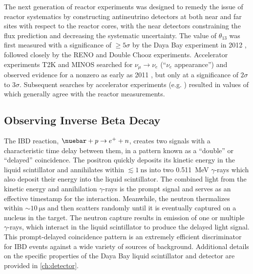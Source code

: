 The next generation of reactor experiments
was designed to remedy the issue of reactor systematics
by constructing antineutrino detectors at both near and far sites
with respect to the reactor cores,
with the near detectors constraining the flux prediction
and decreasing the systematic uncertainty.
The value of $\theta_{13}$ was first measured
with a significance of $\geq 5\sigma$
by the Daya Bay experiment in 2012 \cite{ngd2012},
followed closely by the RENO \cite{reno2012}
and Double Chooz \cite{doublechooz2012} experiments.
Accelerator experiments T2K and MINOS
searched for $\nu_\mu\to\nu_e$ (``$\nu_e$ appearance'')
and observed evidence for a nonzero \thetaot{}
as early as 2011 \cite{t2k2011,minos2011},
but only at a significance of $2\sigma$ to $3\sigma$.
Subsequent searches by accelerator experiments (e.g. \cite{t2k2018})
resulted in values of \thetaot{} which generally agree
with the reactor measurements.

\subsection{Observing Inverse Beta Decay}
\label{subsec:ibd_intro}

The IBD reaction, $\nuebar + p \to e^+ + n$,
creates two signals with a characteristic
time delay between them, in a pattern known as a ``double''
or ``delayed'' coincidence.
The positron quickly deposits its kinetic energy in the liquid scintillator
and annihilates within $\lesssim\SI{1}{\nano\second}$
into two \SI{0.511}{\MeV} $\gamma$-rays
which also deposit their energy into the liquid scintillator.
The combined light from the kinetic energy and annihilation $\gamma$-rays
is the prompt signal
and serves as an effective timestamp for the interaction.
Meanwhile, the neutron thermalizes within $\sim \SI{10}{\micro\second}$
and then scatters randomly until it is eventually captured
on a nucleus in the target.
The neutron capture results in emission of one or multiple $\gamma$-rays,
which interact in the liquid scintillator to produce the delayed light signal.
This prompt-delayed coincidence pattern is an extremely efficient
discriminator for IBD events against a wide variety of sources of background.
Additional details on the specific properties of the Daya Bay
liquid scintillator and detector are provided in \cref{ch:detector}.



